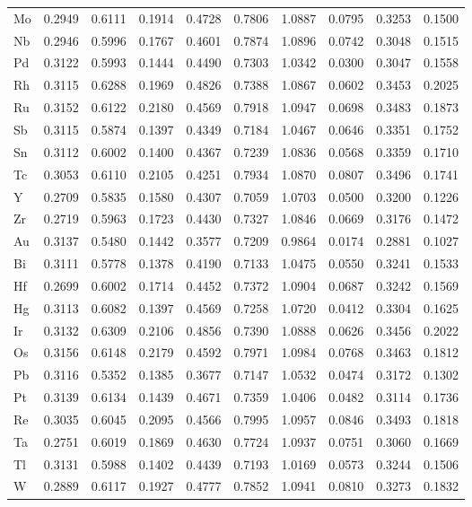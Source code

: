 \begin{table}[htbp]
{\begin{tabular}{l *{9}{c}}
      Mo & 0.2949 & 0.6111 & 0.1914 & 0.4728 & 0.7806 & 1.0887 & 0.0795 & 0.3253 & 0.1500 \\
      Nb & 0.2946 & 0.5996 & 0.1767 & 0.4601 & 0.7874 & 1.0896 & 0.0742 & 0.3048 & 0.1515 \\
      Pd & 0.3122 & 0.5993 & 0.1444 & 0.4490 & 0.7303 & 1.0342 & 0.0300 & 0.3047 & 0.1558 \\
      Rh & 0.3115 & 0.6288 & 0.1969 & 0.4826 & 0.7388 & 1.0867 & 0.0602 & 0.3453 & 0.2025 \\
      Ru & 0.3152 & 0.6122 & 0.2180 & 0.4569 & 0.7918 & 1.0947 & 0.0698 & 0.3483 & 0.1873 \\
      Sb & 0.3115 & 0.5874 & 0.1397 & 0.4349 & 0.7184 & 1.0467 & 0.0646 & 0.3351 & 0.1752 \\
      Sn & 0.3112 & 0.6002 & 0.1400 & 0.4367 & 0.7239 & 1.0836 & 0.0568 & 0.3359 & 0.1710 \\
      Tc & 0.3053 & 0.6110 & 0.2105 & 0.4251 & 0.7934 & 1.0870 & 0.0807 & 0.3496 & 0.1741 \\
      Y  & 0.2709 & 0.5835 & 0.1580 & 0.4307 & 0.7059 & 1.0703 & 0.0500 & 0.3200 & 0.1226 \\
      Zr & 0.2719 & 0.5963 & 0.1723 & 0.4430 & 0.7327 & 1.0846 & 0.0669 & 0.3176 & 0.1472 \\
      Au & 0.3137 & 0.5480 & 0.1442 & 0.3577 & 0.7209 & 0.9864 & 0.0174 & 0.2881 & 0.1027 \\
      Bi & 0.3111 & 0.5778 & 0.1378 & 0.4190 & 0.7133 & 1.0475 & 0.0550 & 0.3241 & 0.1533 \\
      Hf & 0.2699 & 0.6002 & 0.1714 & 0.4452 & 0.7372 & 1.0904 & 0.0687 & 0.3242 & 0.1569 \\
      Hg & 0.3113 & 0.6082 & 0.1397 & 0.4569 & 0.7258 & 1.0720 & 0.0412 & 0.3304 & 0.1625 \\
      Ir & 0.3132 & 0.6309 & 0.2106 & 0.4856 & 0.7390 & 1.0888 & 0.0626 & 0.3456 & 0.2022 \\
      Os & 0.3156 & 0.6148 & 0.2179 & 0.4592 & 0.7971 & 1.0984 & 0.0768 & 0.3463 & 0.1812 \\
      Pb & 0.3116 & 0.5352 & 0.1385 & 0.3677 & 0.7147 & 1.0532 & 0.0474 & 0.3172 & 0.1302 \\
      Pt & 0.3139 & 0.6134 & 0.1439 & 0.4671 & 0.7359 & 1.0406 & 0.0482 & 0.3114 & 0.1736 \\
      Re & 0.3035 & 0.6045 & 0.2095 & 0.4566 & 0.7995 & 1.0957 & 0.0846 & 0.3493 & 0.1818 \\
      Ta & 0.2751 & 0.6019 & 0.1869 & 0.4630 & 0.7724 & 1.0937 & 0.0751 & 0.3060 & 0.1669 \\
      Tl & 0.3131 & 0.5988 & 0.1402 & 0.4439 & 0.7193 & 1.0169 & 0.0573 & 0.3244 & 0.1506 \\
      W  & 0.2889 & 0.6117 & 0.1927 & 0.4777 & 0.7852 & 1.0941 & 0.0810 & 0.3273 & 0.1832 \\
      \bottomrule
    \end{tabular}
  }
\end{table}

